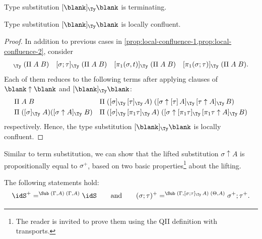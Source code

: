 \documentclass[a4paper,UKenglish,numberwithinsect,cleveref,thm-restate]{lipics-v2021}
\newcommand{\danger}{\marginpar[\hfill\dbend]{\dbend\hfill}}
\begin{document}
\begin{proposition}[Termination]
  Type substitution $[\blank]_{\Ty}\blank$ is terminating.
  \danger
\end{proposition}
\begin{proposition}\label{prop:local-confluence-3}
  Type substitution $[\blank]_{\Ty}\blank$ is locally confluent.
  \danger
\end{proposition}
\begin{proof}
  In addition to previous cases in \cref{prop:local-confluence-1,prop:local-confluence-2}, consider
  \begin{align*}
    [\idS]_{\Ty}\;(\Pi\;A\;B) && [\sigma;\tau]_{\Ty}\;(\Pi\;A\;B) && [\pi_1(\sigma, t)]_{\Ty}\;(\Pi\;A\;B) && [\pi_1(\sigma; \tau)]_{\Ty}\;(\Pi\;A\;B).
  \end{align*}
  Each of them reduces to the following terms after applying clauses of $\blank\uparrow\blank$ and $[\blank]_{\Ty}\blank$:
  \begin{align*}
    & \Pi\;A\;B                && \Pi\;([\sigma]_{\Ty}\,[\tau]_{\Ty}\,A)\;([\sigma \uparrow [\tau]\,A ]_{\Ty}\,[\tau \uparrow A ]_{\Ty}\,B) \\
    & \Pi\;([\sigma]_{\Ty}\;A)([\sigma \uparrow A]_{\Ty}\;B) && \Pi\;([\sigma]_{\Ty}\,[\pi_1\tau]_{\Ty}\,A)\;([\sigma \uparrow [\pi_1\tau]_{\Ty}\,[\pi_1\tau \uparrow A]_{\Ty}\,B)
  \end{align*}
  respectively.
  Hence, the type substitution $[\blank]_{\Ty}\blank$ is locally confluent.
\end{proof}

Similar to term substitution, we can show that the lifted substitution $\sigma \uparrow A$ is propositionally equal to $\sigma^+$, based on two basic properties\footnote{%
  The reader is invited to prove them using the QII definition with transports.}
about the lifting.
\begin{lemma} \label{lem:lifting}
  The following statements hold:
  \[
    \idS^+ =^{\Sub\;(\Gamma, A)\;(\Gamma, A)} \idS
    \qquad\text{and}\qquad
    (\sigma; \tau)^+     =^{\Sub\;(\Gamma, [\sigma; \tau]_{\Ty}\,A)\;(\Theta, A)} \sigma^+ ; \tau^+.
  \]
\end{lemma}
\end{document}
